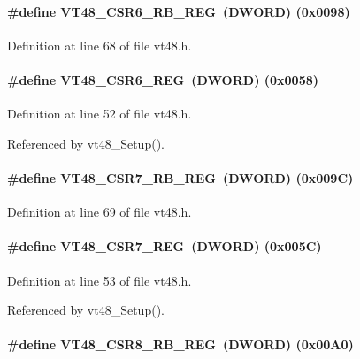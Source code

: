 \paragraph[{VT48\_\-CSR6\_\-RB\_\-REG}]{\setlength{\rightskip}{0pt plus 5cm}\#define VT48\_\-CSR6\_\-RB\_\-REG~({\bf DWORD}) (0x0098)}\hfill\label{vt48_8h_a0489e71e81acb81762d20dab74eacb7d}


Definition at line 68 of file vt48.h.
\paragraph[{VT48\_\-CSR6\_\-REG}]{\setlength{\rightskip}{0pt plus 5cm}\#define VT48\_\-CSR6\_\-REG~({\bf DWORD}) (0x0058)}\hfill\label{vt48_8h_ada5fc4a95410cce888ea34b0a868a929}


Definition at line 52 of file vt48.h.

Referenced by vt48\_\-Setup().
\paragraph[{VT48\_\-CSR7\_\-RB\_\-REG}]{\setlength{\rightskip}{0pt plus 5cm}\#define VT48\_\-CSR7\_\-RB\_\-REG~({\bf DWORD}) (0x009C)}\hfill\label{vt48_8h_a6f7ce796bce7ff8079bf2766f244e36b}


Definition at line 69 of file vt48.h.
\paragraph[{VT48\_\-CSR7\_\-REG}]{\setlength{\rightskip}{0pt plus 5cm}\#define VT48\_\-CSR7\_\-REG~({\bf DWORD}) (0x005C)}\hfill\label{vt48_8h_ab7136ac5c972a16a2d7572f159d5eaab}


Definition at line 53 of file vt48.h.

Referenced by vt48\_\-Setup().
\paragraph[{VT48\_\-CSR8\_\-RB\_\-REG}]{\setlength{\rightskip}{0pt plus 5cm}\#define VT48\_\-CSR8\_\-RB\_\-REG~({\bf DWORD}) (0x00A0)}\hfill\label{vt48_8h_af986b6ac66e5a0522d326bd1f26fb63a}


